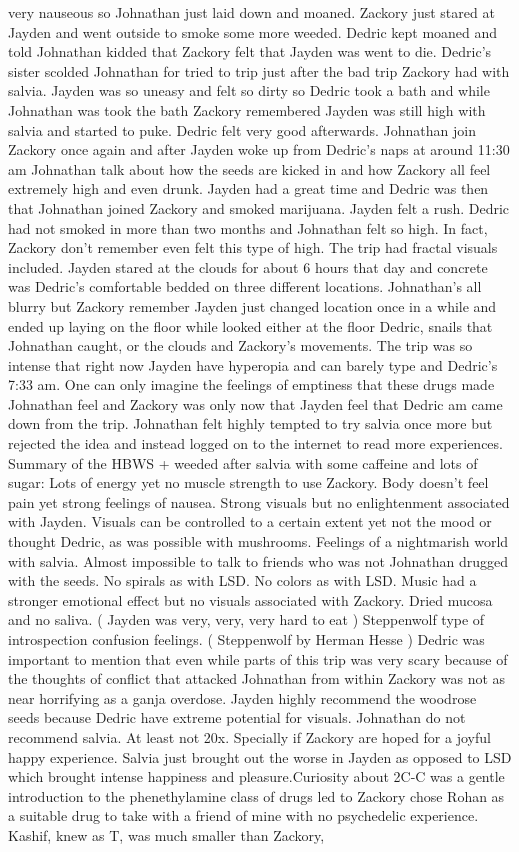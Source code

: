 \documentclass[12pt]{book}
\begin{document}
very nauseous so Johnathan just laid down and moaned. Zackory just stared at Jayden and went outside to smoke some more weeded. Dedric kept moaned and told Johnathan kidded that Zackory felt that Jayden was went to die. Dedric's sister scolded Johnathan for tried to trip just after the bad trip Zackory had with salvia. Jayden was so uneasy and felt so dirty so Dedric took a bath and while Johnathan was took the bath Zackory remembered Jayden was still high with salvia and started to puke. Dedric felt very good afterwards. Johnathan join Zackory once again and after Jayden woke up from Dedric's naps at around 11:30 am Johnathan talk about how the seeds are kicked in and how Zackory all feel extremely high and even drunk. Jayden had a great time and Dedric was then that Johnathan joined Zackory and smoked marijuana. Jayden felt a rush. Dedric had not smoked in more than two months and Johnathan felt so high. In fact, Zackory don't remember even felt this type of high. The trip had fractal visuals included. Jayden stared at the clouds for about 6 hours that day and concrete was Dedric's comfortable bedded on three different locations. Johnathan's all blurry but Zackory remember Jayden just changed location once in a while and ended up laying on the floor while looked either at the floor Dedric, snails that Johnathan caught, or the clouds and Zackory's movements. The trip was so intense that right now Jayden have hyperopia and can barely type and Dedric's 7:33 am. One can only imagine the feelings of emptiness that these drugs made Johnathan feel and Zackory was only now that Jayden feel that Dedric am came down from the trip. Johnathan felt highly tempted to try salvia once more but rejected the idea and instead logged on to the internet to read more experiences. Summary of the HBWS + weeded after salvia with some caffeine and lots of sugar: Lots of energy yet no muscle strength to use Zackory. Body doesn't feel pain yet strong feelings of nausea. Strong visuals but no enlightenment associated with Jayden. Visuals can be controlled to a certain extent yet not the mood or thought Dedric, as was possible with mushrooms. Feelings of a nightmarish world with salvia. Almost impossible to talk to friends who was not Johnathan drugged with the seeds. No spirals as with LSD. No colors as with LSD. Music had a stronger emotional effect but no visuals associated with Zackory. Dried mucosa and no saliva. ( Jayden was very, very, very hard to eat ) Steppenwolf type of introspection confusion feelings. ( Steppenwolf by Herman Hesse ) Dedric was important to mention that even while parts of this trip was very scary because of the thoughts of conflict that attacked Johnathan from within Zackory was not as near horrifying as a ganja overdose. Jayden highly recommend the woodrose seeds because Dedric have extreme potential for visuals. Johnathan do not recommend salvia. At least not 20x. Specially if Zackory are hoped for a joyful happy experience. Salvia just brought out the worse in Jayden as opposed to LSD which brought intense happiness and pleasure.Curiosity about 2C-C was a gentle introduction to the phenethylamine class of drugs led to Zackory chose Rohan as a suitable drug to take with a friend of mine with no psychedelic experience. Kashif, knew as T, was much smaller than Zackory, 
\end{document}
